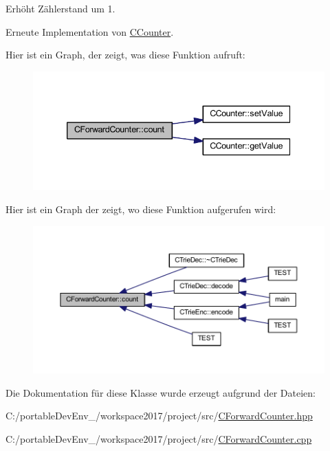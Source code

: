 Erhöht Zählerstand um 1. 



Erneute Implementation von \hyperlink{class_c_counter_a90f3e164f3fc1dcf91044702d6940c4d}{C\+Counter}.

Hier ist ein Graph, der zeigt, was diese Funktion aufruft\+:
\nopagebreak
\begin{figure}[H]
\begin{center}
\leavevmode
\includegraphics[width=339pt]{class_c_forward_counter_afc451afa9f8b76f70b28c08982265a86_cgraph}
\end{center}
\end{figure}
Hier ist ein Graph der zeigt, wo diese Funktion aufgerufen wird\+:
\nopagebreak
\begin{figure}[H]
\begin{center}
\leavevmode
\includegraphics[width=350pt]{class_c_forward_counter_afc451afa9f8b76f70b28c08982265a86_icgraph}
\end{center}
\end{figure}


Die Dokumentation für diese Klasse wurde erzeugt aufgrund der Dateien\+:\begin{DoxyCompactItemize}
\item 
C\+:/portable\+Dev\+Env\+\_/workspace2017/project/src/\hyperlink{_c_forward_counter_8hpp}{C\+Forward\+Counter.\+hpp}\item 
C\+:/portable\+Dev\+Env\+\_/workspace2017/project/src/\hyperlink{_c_forward_counter_8cpp}{C\+Forward\+Counter.\+cpp}\end{DoxyCompactItemize}
